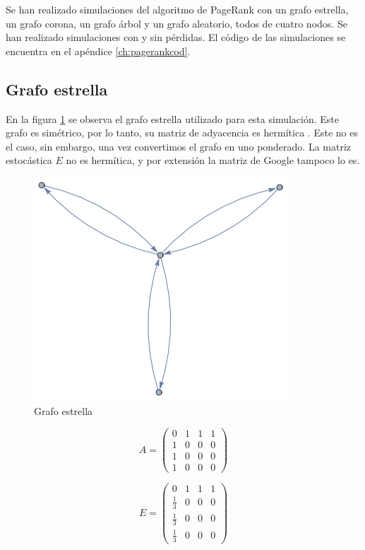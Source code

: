 Se han realizado simulaciones del algoritmo de PageRank con un grafo estrella, un grafo corona, un grafo árbol y un grafo aleatorio, todos de cuatro nodos. Se han realizado simulaciones con y sin pérdidas. El código de las simulaciones se encuentra en el apéndice \ref{ch:pagerankcod}.

\subsection{Grafo estrella}

En la figura \ref{fig:star} se observa el grafo estrella utilizado para esta simulación. Este grafo es simétrico, por lo tanto, su matriz de adyacencia es hermítica%
. Este no es el caso, sin embargo, una vez convertimos el grafo en uno ponderado. La matriz estocástica $E$ no es hermítica, y por extensión la matriz de Google tampoco lo es.

\begin{figure}[H]
    \centering
    \includegraphics[width=0.5\linewidth]{img/star.png}
    \caption[Grafo estrella]{Grafo estrella}
    \label{fig:star}
\end{figure}

\begin{equation}
    A =
    \begin{pmatrix}
        0 & 1 & 1 & 1 \\
        1 & 0 & 0 & 0 \\
        1 & 0 & 0 & 0 \\
        1 & 0 & 0 & 0
    \end{pmatrix}
\end{equation}

\begin{equation}
    E = 
    \begin{pmatrix}
        0 & 1 & 1 & 1 \\
        \frac{1}{3} & 0 & 0 & 0 \\
        \frac{1}{3} & 0 & 0 & 0 \\
        \frac{1}{3} & 0 & 0 & 0
    \end{pmatrix}
\end{equation}

